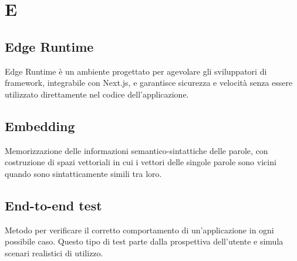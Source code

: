 \chapter{E}

\section{Edge Runtime}
Edge Runtime è un ambiente progettato per agevolare gli sviluppatori di framework, integrabile con Next.js, e garantisce sicurezza e velocità senza essere utilizzato direttamente nel codice dell'applicazione.

\section{Embedding}\label{sec:Embeddings}
Memorizzazione delle informazioni semantico-sintattiche delle parole, con costruzione di spazi vettoriali in cui i vettori delle singole parole sono vicini quando sono sintatticamente simili tra loro.

\section{End-to-end test}
Metodo per verificare il corretto comportamento di un'applicazione in ogni possibile caso. Questo tipo di test parte dalla prospettiva dell'utente e simula scenari realistici di utilizzo.
